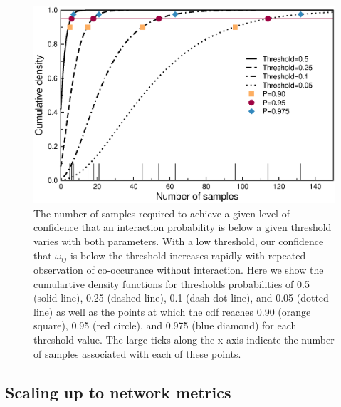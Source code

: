 ﻿\documentclass[12pt]{article}
\begin{document}
      \begin{figure}[ht]
        \caption{The number of samples required to achieve a given level of confidence that an interaction probability is below a given threshold varies with both parameters. With a low threshold, our confidence that $\omega_{ij}$ is below the threshold increases rapidly with repeated observation of co-occurance without interaction. Here we show the cumulartive density functions for thresholds probabilities of 0.5 (solid line), 0.25 (dashed line), 0.1 (dash-dot line), and 0.05 (dotted line) as well as the points at which the cdf reaches 0.90 (orange square), 0.95 (red circle), and 0.975 (blue diamond) for each threshold value. The large ticks along the x-axis indicate the number of samples associated with each of these points.}
        \label{Salix_cdfs}
        \includegraphics[width=.8\textwidth]{figures/Salix_Galler_samples_and_cdfs.eps}

        \end{figure}


  \subsection*{Scaling up to network metrics}




\clearpage

     
\end{document}
